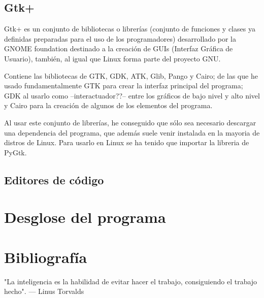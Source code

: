 \documentclass[a4paper, 11pt, twoside]{article} %
\begin{document}
\subsection{Gtk+}
Gtk+ es un conjunto de bibliotecas o librerías (conjunto de funciones y clases ya definidas preparadas para el uso de los programadores) desarrollado por la GNOME foundation destinado a la creación de GUIs (Interfaz Gráfica de Usuario), también, al igual que Linux forma parte del proyecto GNU.

Contiene las bibliotecas de GTK, GDK, ATK, Glib, Pango y Cairo; de las que he usado fundamentalmente GTK para crear la interfaz principal del programa; GDK al usarlo como --interactuador??-- entre los gráficos de bajo nivel y alto nivel y Cairo para la creación de algunos de los elementos del programa.

Al usar este conjunto de librerías, he conseguido que sólo sea necesario descargar una dependencia del programa, que además suele venir instalada en la mayoria de distros de Linux. Para usarlo en Linux se ha tenido que importar la libreria de PyGtk.
\subsection{Editores de código}

\section{Desglose del programa}
\newpage{}
\section{Bibliografía}
\printbibliography

\newpage
\thispagestyle{empty}
\vspace*{\fill}
\begin{displayquote}"La inteligencia es la habilidad de evitar hacer el trabajo, consiguiendo el trabajo hecho". --- Linus Torvalds
\end{displayquote} 
\doclicenseThis
\vspace*{\fill}
\end{document}
